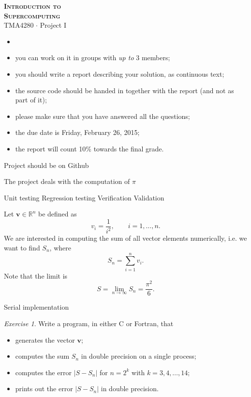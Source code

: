 \documentclass[onecolumn, oneside, a4paper, 11pt]{memoir}
\theoremstyle{remark}
\newtheorem{ex}{Exercise}
\begin{document}
\pagestyle{empty}

\begin{center}
  {\Huge \bfseries \scshape
    Introduction to \\[0.2\baselineskip] Supercomputing} \\[2\baselineskip]
  {\Large TMA4280 $\cdot$ Project I} \\[2\baselineskip]
\end{center}

\textbf{}
\begin{itemize}
\item 
\item you can work on it in groups with \emph{up to} 3 members;
\item you should write a report describing your solution, as continuous text;
\item the source code should be handed in together with the report (and not as
  part of it);
\item please make sure that you have answered all the questions;
\item the due date is Friday, February 26, 2015;
\item the report will count 10\% towards the final grade.
\end{itemize}


Project should be on Github




The project deals with the computation of $\pi$


Unit testing
Regression testing
Verification
Validation


Let $\bm v \in \mathbb{R}^n$ be defined as
\[
  v_i = \frac{1}{i^2}, \qquad i=1,\ldots,n.
\]
We are interested in computing the sum of all vector elements numerically, i.e.
we want to find $S_n$, where
\[
  S_n = \sum_{i=1}^n v_i.
\]
Note that the limit is
\[
  S = \lim_{n\to\infty} S_n = \frac{\pi^2}{6}.
\]


Serial implementation

\begin{ex}
  Write a program, in either C or Fortran, that
  \begin{itemize}
  \item generates the vector $\bm v$;
  \item computes the sum $S_n$ in double precision on a single process;
  \item computes the error $|S - S_n|$ for $n=2^k$ with $k=3,4,\ldots,14$;
  \item prints out the error $|S - S_n|$ in double precision.
  \end{itemize}
\end{ex}
\end{document}
